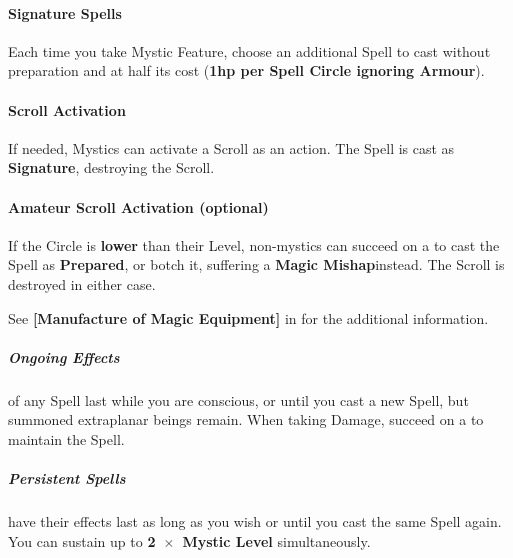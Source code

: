 \documentclass[itdr/core]{subfiles}
\begin{document}

\paragraph{Signature Spells}
Each time you take Mystic Feature, choose an additional Spell to cast without preparation and at half its cost (\textbf{1hp per Spell Circle ignoring Armour}).

\paragraph{Scroll Activation}
If needed, Mystics can activate a Scroll as an action. The Spell is cast as \textbf{Signature}, destroying the Scroll.

\begin{dbox}
	\paragraph{Amateur Scroll Activation (optional)}
	If the Circle is \textbf{lower} than their Level, non-mystics can succeed on a  to cast the Spell as \mbox{\textbf{Prepared}}, or botch it, suffering a \textbf{Magic Mishap}\footnotemark[1] \mbox{instead.} The Scroll is destroyed in either case.
\end{dbox}

\begin{dbox}
	See \textbf{[Manufacture of Magic Equipment]} in \mbox{\textbf{}} for the additional information.
\end{dbox}

\enlargethispage{1ex}
\break


\subparagraph{Ongoing Effects} of any Spell last while you are conscious, or until you cast a new Spell, but summoned extraplanar beings remain. When taking Damage, succeed on a  to maintain the Spell.

\subparagraph{Persistent Spells} have their effects last as long as you wish or until you cast the same Spell again. You can sustain up to \textbf{2~$\times$~Mystic Level} simultaneously.
\end{document}
